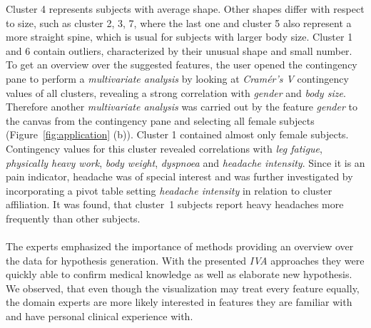 \documentclass[journal]{style/vgtc} 			          %
\newcommand{\add}[1]{\textcolor{blue}{\uline{#1}}}
\newcommand{\com}[1]{\textcolor{orange}{\uline{#1}}}
\begin{document}
Cluster 4 represents subjects with average shape.
%
Other shapes differ with respect to size, such as cluster 2, 3, 7, where the last one and cluster 5 also represent a more straight spine, which is usual for subjects with larger body size.
%
Cluster 1 and 6 contain outliers, characterized by their unusual shape and small number.
%
%
To get an overview over the suggested features, the user opened the contingency pane to perform a \emph{multivariate analysis} by looking at \emph{Cram\'{e}r's V} contingency values of all clusters, revealing a strong correlation with \emph{gender} and \emph{body size}.
%
Therefore another \emph{multivariate analysis} was carried out by the feature \emph{gender} to the canvas from the contingency pane and selecting all female subjects (Figure~\ref{fig:application} (b)).
%
Cluster 1 contained almost only female subjects.
%
Contingency values for this cluster revealed correlations with \emph{leg fatigue}, \emph{physically heavy work}, \emph{body weight}, \emph{dyspnoea} and \emph{headache intensity}.
%
%
Since it is an pain indicator, headache was of special interest and was further investigated by incorporating a pivot table setting \emph{headache intensity} in relation to cluster affiliation.
%
It was found, that cluster~1 subjects report heavy headaches more frequently than other subjects.
%
%
%
%
\\\\
The experts emphasized the importance of methods providing an overview over the data for hypothesis generation.
%
With the presented \emph{IVA} approaches they were quickly able to confirm medical knowledge as well as elaborate new hypothesis.
%
We observed, that even though the visualization may treat every feature equally, the domain experts are more likely interested in features they are familiar with and have personal clinical experience with.
\end{document}
